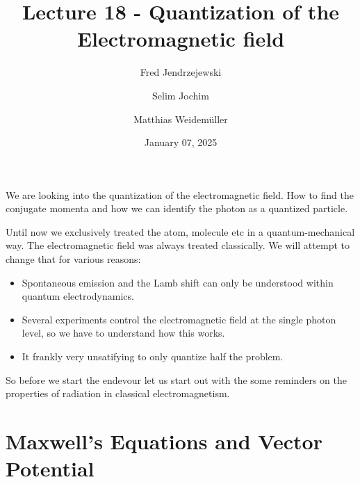 \documentclass[10pt]{article}
\renewenvironment{abstract}
  {{\bfseries\noindent{\abstractname}\par\nobreak}\footnotesize}
  {\bigskip}
\begin{document}
\title{Lecture 18 - Quantization of the Electromagnetic field}



\author[1]{Fred Jendrzejewski}%
\author[2]{Selim Jochim}%
\author[2]{Matthias Weidemüller}%
%
%


\vspace{-1em}



  
  \date{January 07, 2025}


\begingroup
\let\center\flushleft
\let\endcenter\endflushleft
\maketitle
\endgroup





\begin{abstract}
We are looking into the quantization of the electromagnetic field. How to find the conjugate momenta and how we can identify the photon as a quantized particle.%
\end{abstract}%



\sloppy


Until now we exclusively treated the atom, molecule etc in a quantum-mechanical way. The electromagnetic field was always treated classically. We will attempt to change that for various reasons:
\begin{itemize}
\item Spontaneous emission and the Lamb shift can only be understood within quantum electrodynamics.
\item Several experiments control the electromagnetic field at the single photon level, so we have to understand how this works.
\item It frankly very unsatifying to only quantize half the problem.
\end{itemize}

So before we start the endevour let us start out with the some reminders on the properties of radiation in classical electromagnetism.

\section{Maxwell's Equations and Vector Potential}
\end{document}
